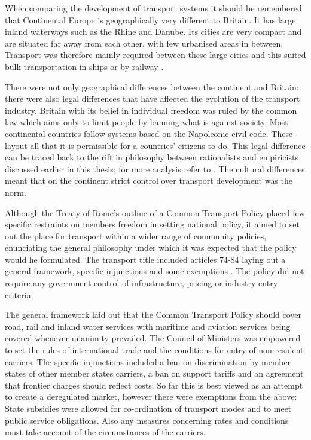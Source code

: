 When comparing the development of transport systems it should be remembered that Continental Europe is geographically very different to Britain. It has large inland waterways such as the Rhine and Danube. Its cities are very compact and are situated far away from each other, with few urbanised areas in between. Transport was therefore mainly required between these large cities and this suited bulk transportation in ships or by railway \cite{Gwilliam:1975}.

There were not only geographical differences between the continent and Britain: there were also legal differences that have affected the evolution of the transport industry. Britain with its belief in individual freedom was ruled by the common law which aims only to limit people by banning what is against society. Most continental countries follow systems based on the Napoleonic civil code. These layout all that it is permissible for a countries' citizens to do. This legal difference can be traced back to the rift in philosophy between rationalists and empiricists discussed earlier in this thesis; for more analysis refer to \cite{Hibbs:1993b}. The cultural differences meant that on the continent strict control over transport development was the norm.

Although the Treaty of Rome's outline of a Common Transport Policy placed few specific restraints on members freedom in setting national policy, it aimed to set out the place for transport within a wider range of community policies, enunciating the general philosophy under which it was expected that the policy would he formulated. The transport title included articles 74-84 laying out a general framework, specific injunctions and some exemptions \cite{Gwilliam:1975}. The policy did not require any government control of infrastructure, pricing or industry entry criteria.

The general framework laid out that the Common Transport Policy should cover road, rail and inland water services with maritime and aviation services being covered whenever unanimity prevailed. The Council of Ministers was empowered to set the rules of international trade and the conditions for entry of non-resident carriers. The specific injunctions included a ban on discrimination by member states of other member states carriers, a ban on support tariffs and an agreement that frontier charges should reflect costs. So far this is best viewed as an attempt to create a deregulated market, however there were exemptions from the above: State subsidies were allowed for co-ordination of transport modes and to meet public service obligations. Also any measures concerning rates and conditions must take account of the circumstances of the carriers.

